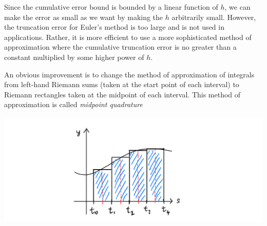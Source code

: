 \documentclass{article}
\theoremstyle{remark}
\theoremstyle{definition}
\begin{document}
Since the cumulative error bound is bounded by a linear function of $h$, we can make the error as small as we want by making the $h$ arbitrarily small. However, the truncation error for Euler's method is too large and is not used in applications. Rather, it is more efficient to use a more sophisticated method of approximation where the cumulative truncation error is no greater than a constant multiplied by some higher power of $h$. 

An obvious improvement is to change the method of approximation of integrals from left-hand Riemann sums (taken at the start point of each interval) to Riemann rectangles taken at the midpoint of each interval. This method of approximation is called \textit{midpoint quadrature}
\begin{center}
    \includegraphics[scale=0.28]{img/Midpoint_Quadrature.PNG}
\end{center}
\end{document}
